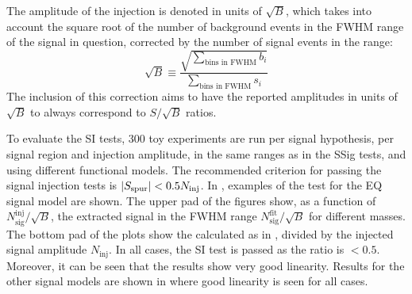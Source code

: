 The amplitude of the injection is denoted in units of \(\sqrt{B}\), which takes into account the square root of the number of background events in the \ac{FWHM} range of the signal in question, corrected by the number of signal events in the range:
\begin{equation*}
    \sqrt{B} \equiv \frac{
        \displaystyle
        \sqrt{\sum_{\text{bins in FWHM}} b_i}
        }{
        \displaystyle
        \sum_{\text{bins in FWHM}} s_i 
    }
\end{equation*}
The inclusion of this correction aims to have the reported amplitudes in units of \(\sqrt{B}\) to always correspond to \(S / \sqrt{B}\) ratios. 

To evaluate the \ac{SI} tests, 300 toy experiments are run per signal hypothesis, per signal region and injection amplitude, in the same ranges as in the \ac{SSig} tests, and using different functional models. The recommended criterion for passing the signal injection tests is \(|S_{\text{spur}}| < 0.5 N_{\text{inj}}\). In \Fig{\ref{fig:bkg:modeling:sigbkg:sitest:siginj_qstar}}, examples of the test for the \ac{EQ} signal model are shown. The upper pad of the figures show, as a function of \(N_{\text{sig}}^{\text{inj}} / \sqrt{B}\), the extracted signal in the \ac{FWHM} range \(N_{\text{sig}}^{\text{fit}} / \sqrt{B}\) for different masses. The bottom pad of the plots show the \sspur calculated as in \Eqn{\ref{eq:bkg:modeling:sigbkg:sitest:sspur_definition}}, divided by the injected signal amplitude \(N_{\text{inj}}\). In all cases, the \ac{SI} test is passed as the ratio is \(<0.5\). Moreover, it can be seen that the results show very good linearity. Results for the other signal models are shown in \App{\ref{app:si_results}} where good linearity is seen for all cases.

